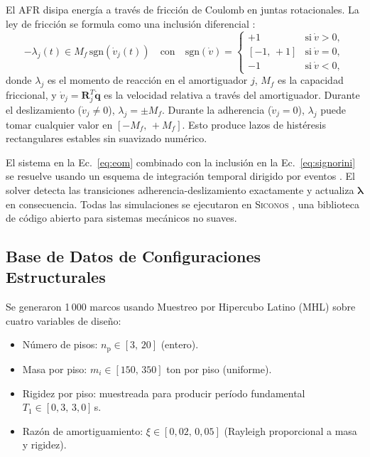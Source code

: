 \documentclass[preprint,12pt,authoryear]{elsarticle}
\newcommand{\np}{n_{\mathrm{p}}}
\newcommand{\Mf}{M_{\!f}}
\begin{document}
El AFR disipa energía a través de fricción de Coulomb en juntas rotacionales. La ley de 
fricción se formula como una inclusión diferencial \citep{Namorado2024}:
\begin{equation}
  -\lambda_j(t) \in \Mf \,\mathrm{sgn}(\dot{v}_j(t))
  \quad\text{con}\quad
  \mathrm{sgn}(\dot{v}) =
  \begin{cases}
    +1            & \text{si}~\dot{v} > 0,\\
    [-1,\,+1]     & \text{si}~\dot{v} = 0,\\
    -1            & \text{si}~\dot{v} < 0,
  \end{cases}
  \label{eq:signorini}
\end{equation}
donde $\lambda_j$ es el momento de reacción en el amortiguador $j$, $\Mf$ es la capacidad 
friccional, y $\dot{v}_j = \mathbf{R}_j^T \dot{\mathbf{q}}$ es la velocidad relativa a 
través del amortiguador. Durante el deslizamiento ($\dot{v}_j \neq 0$), $\lambda_j = \pm\Mf$. 
Durante la adherencia ($\dot{v}_j = 0$), $\lambda_j$ puede tomar cualquier valor en 
$[-\Mf,\,+\Mf]$. Esto produce lazos de histéresis rectangulares estables sin suavizado numérico.

El sistema en la Ec.~\eqref{eq:eom} combinado con la inclusión en la Ec.~\eqref{eq:signorini} 
se resuelve usando un esquema de integración temporal dirigido por eventos 
\citep{acary_numerical_2008}. El solver detecta las transiciones adherencia-deslizamiento 
exactamente y actualiza $\bm{\lambda}$ en consecuencia. Todas las simulaciones se ejecutaron 
en \textsc{Siconos} \citep{siconos}, una biblioteca de código abierto para sistemas mecánicos 
no suaves.

\subsection{Base de Datos de Configuraciones Estructurales}
\label{sec:database}

Se generaron 1\,000 marcos usando Muestreo por Hipercubo Latino (MHL) sobre cuatro variables 
de diseño:

\begin{itemize}[leftmargin=1.5em]
  \item Número de pisos: $\np \in [3,\,20]$ (entero).
  \item Masa por piso: $m_i \in [150,\,350]$ ton por piso (uniforme).
  \item Rigidez por piso: muestreada para producir período fundamental $T_1 \in [0{,}3,\,3{,}0]$\,s.
  \item Razón de amortiguamiento: $\xi \in [0{,}02,\,0{,}05]$ (Rayleigh proporcional a masa y rigidez).
\end{itemize}
\end{document}
